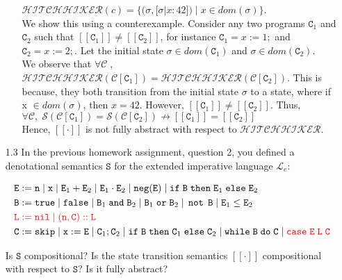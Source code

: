 \documentclass{article}
\newcommand{\E}{\mathtt{E}}
\newcommand{\B}{\mathtt{B}}
\newcommand{\C}{\mathtt{C}}
\newcommand{\LL}{\mathtt{L}}
\newcommand{\true}{\mathtt{true}}
\newcommand{\false}{\mathtt{false}}
\newcommand{\andsym}{\mathtt{and}}
\newcommand{\orsym}{\mathtt{or}}
\newcommand{\notsym}{\mathop{\mathtt{not}}}
\newcommand{\ifsym}{\mathtt{if}}
\newcommand{\then}{\mathtt{then}}
\newcommand{\elsesym}{\mathtt{else}}
\newcommand{\whilesym}{\mathtt{while}}
\newcommand{\dosym}{\mathtt{do}}
\newcommand{\skipsym}{\mathtt{skip}}
\newcommand{\nil}{\mathtt{nil}}
\newcommand{\case}{\mathtt{case}}
\newcommand{\negation}{\mathtt{neg}}
\newcommand{\Sem}{\mathtt{S}}
\newcommand{\question}[1]
{\color{DarkBlue}#1 \color{Black}}
\begin{document}
\begin{enumerate}
\begin{enumerate}
	$ \mathcal{HITCHHIKER}(c) = \{ (\sigma, [ \sigma | x : 42 ] ) 
	\; | \; x \in dom (\sigma) \}$.\\
	
	We show this using a counterexample. 
	Consider any two programs $\C_1$ and $\C_2$ such that $[[ \C_1 ]] \neq [[\C_2
	]]$, for instance $\C_1 = x := 1;$ and $\C_2 = x := 2;$.
	Let the initial state $\sigma \in dom(\C_1)$ and  $\sigma \in dom(\C_2)$.\\

	We observe that	$\forall \mathcal{C} \;$, 
	$\mathcal{HITCHHIKER}(\mathcal{C}[\C_1]) =
	\mathcal{HITCHHIKER}(\mathcal{C}[\C_2])$.
    This is because, they both transition from the initial state $\sigma$
    to a state, where if x $\in dom(\sigma)$, then $x = 42$.      
    However, $[[ \C_1 ]] \neq [[ \C_2 ]]$. Thus,\\

    $\forall \mathcal{C}, \;	
	\mathcal{S}(\mathcal{C}[\C_1]) = \mathcal{S}(\mathcal{C}[\C_2])	
	\nrightarrow 
	[[\C_1]] = [[\C_2]] $ \\
    
    Hence, $[[\cdot]]$ is not fully abstract with respect to
    $\mathcal{HITCHHIKER}$.

\end{enumerate}
            
\question{
\item[1.3] In the previous homework assignment, question 2, you defined a denotational 
semantics $\Sem$ for the extended imperative language $\mathcal{L}_e$:

\begin{align*}
& \E := \mathtt{n} \; | \; \mathtt{x} \; | \; \E_1 + \E_2 \; | \; \E_1 \cdot \E_2 \; | \; \negation(\E) \; | \; \ifsym \; \B \; \then \; \E_1 \; \elsesym \; \E_2 \\ 
& \B := \true \; | \; \false \; | \; \B_1 \; \andsym \; \B_2 \; | \; \B_1 \; \orsym \; \B_2 \; | \; \notsym \; \B \; | \; \E_1 \leq \E_2 \\
& {\color{red} \LL := \nil \; | \; (\mathtt{n},\C)::\LL} \\
& \C := \skipsym \; | \; \mathtt{x} := \E \; | \; \C_1 ; \C_2 \; | \; \ifsym \; \B \; \then \; \C_1 \; \elsesym \; \C_2 \; | \; \whilesym \; \B \; \dosym \; \C \; | \; {\color{red} \case \; \E \; \LL \; \C}
\end{align*}

Is $\Sem$ compositional? 
Is the state transition semantics $[[\cdot]]$ compositional with respect to $\Sem$? 
Is it fully abstract?
}


\end{enumerate}
\end{document}

